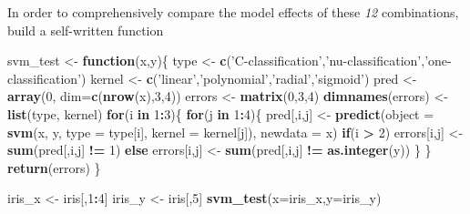 \documentclass[
]{article}
\newenvironment{Shaded}{\begin{snugshade}}{\end{snugshade}}
\newcommand{\ControlFlowTok}[1]{\textcolor[rgb]{0.13,0.29,0.53}{\textbf{#1}}}
\newcommand{\DataTypeTok}[1]{\textcolor[rgb]{0.13,0.29,0.53}{#1}}
\newcommand{\DecValTok}[1]{\textcolor[rgb]{0.00,0.00,0.81}{#1}}
\newcommand{\KeywordTok}[1]{\textcolor[rgb]{0.13,0.29,0.53}{\textbf{#1}}}
\newcommand{\NormalTok}[1]{#1}
\newcommand{\OperatorTok}[1]{\textcolor[rgb]{0.81,0.36,0.00}{\textbf{#1}}}
\newcommand{\StringTok}[1]{\textcolor[rgb]{0.31,0.60,0.02}{#1}}
\begin{document}
In order to comprehensively compare the model effects of these \emph{12}
combinations, build a self-written function

\begin{Shaded}
\begin{Highlighting}[]
\NormalTok{svm_test <-}\StringTok{ }\ControlFlowTok{function}\NormalTok{(x,y)\{}
\NormalTok{  type <-}\StringTok{ }\KeywordTok{c}\NormalTok{(}\StringTok{'C-classification'}\NormalTok{,}\StringTok{'nu-classification'}\NormalTok{,}\StringTok{'one-classification'}\NormalTok{)}
\NormalTok{  kernel <-}\StringTok{ }\KeywordTok{c}\NormalTok{(}\StringTok{'linear'}\NormalTok{,}\StringTok{'polynomial'}\NormalTok{,}\StringTok{'radial'}\NormalTok{,}\StringTok{'sigmoid'}\NormalTok{)}
\NormalTok{  pred <-}\StringTok{ }\KeywordTok{array}\NormalTok{(}\DecValTok{0}\NormalTok{, }\DataTypeTok{dim=}\KeywordTok{c}\NormalTok{(}\KeywordTok{nrow}\NormalTok{(x),}\DecValTok{3}\NormalTok{,}\DecValTok{4}\NormalTok{))}
\NormalTok{  errors <-}\StringTok{ }\KeywordTok{matrix}\NormalTok{(}\DecValTok{0}\NormalTok{,}\DecValTok{3}\NormalTok{,}\DecValTok{4}\NormalTok{)}
  \KeywordTok{dimnames}\NormalTok{(errors) <-}\StringTok{ }\KeywordTok{list}\NormalTok{(type, kernel)}
  \ControlFlowTok{for}\NormalTok{(i }\ControlFlowTok{in} \DecValTok{1}\OperatorTok{:}\DecValTok{3}\NormalTok{)\{}
    \ControlFlowTok{for}\NormalTok{(j }\ControlFlowTok{in} \DecValTok{1}\OperatorTok{:}\DecValTok{4}\NormalTok{)\{}
\NormalTok{      pred[,i,j] <-}\StringTok{ }\KeywordTok{predict}\NormalTok{(}\DataTypeTok{object =} \KeywordTok{svm}\NormalTok{(x, y, }\DataTypeTok{type =}\NormalTok{ type[i], }\DataTypeTok{kernel =}\NormalTok{ kernel[j]), }\DataTypeTok{newdata =}\NormalTok{ x)}
      \ControlFlowTok{if}\NormalTok{(i }\OperatorTok{>}\StringTok{ }\DecValTok{2}\NormalTok{) errors[i,j] <-}\StringTok{ }\KeywordTok{sum}\NormalTok{(pred[,i,j] }\OperatorTok{!=}\StringTok{ }\DecValTok{1}\NormalTok{)}
      \ControlFlowTok{else}\NormalTok{ errors[i,j] <-}\StringTok{ }\KeywordTok{sum}\NormalTok{(pred[,i,j] }\OperatorTok{!=}\StringTok{ }\KeywordTok{as.integer}\NormalTok{(y))}
\NormalTok{      \}}
\NormalTok{    \}}
  \KeywordTok{return}\NormalTok{(errors)}
\NormalTok{\}}

\NormalTok{iris_x <-}\StringTok{ }\NormalTok{iris[,}\DecValTok{1}\OperatorTok{:}\DecValTok{4}\NormalTok{]}
\NormalTok{iris_y <-}\StringTok{ }\NormalTok{iris[,}\DecValTok{5}\NormalTok{]}
\KeywordTok{svm_test}\NormalTok{(}\DataTypeTok{x=}\NormalTok{iris_x,}\DataTypeTok{y=}\NormalTok{iris_y)}
\end{Highlighting}
\end{Shaded}
\end{document}
